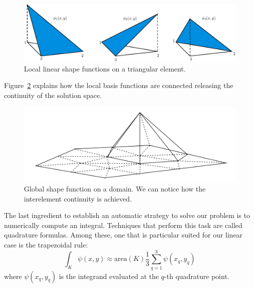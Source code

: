 \documentclass[11pt]{amsart}
\begin{document}
\begin{figure}[h]
\centering
\includegraphics[scale=.8]{local_shape_funcs-pics.pdf}
\caption{Local linear shape functions on a triangular element.}
\label{fig:local}
\end{figure}

Figure~\ref{fig:tent} explains how the local basis functions are connected 
releasing the continuity of the solution space. 

\begin{figure}[h]
\centering
\includegraphics[scale=.4]{tent.png}
\caption{Global shape function on a domain. We can notice how the 
interelement continuity is achieved.}
\label{fig:tent}
\end{figure}

The last ingredient to establish an automatic strategy to solve our problem is 
to numerically compute an integral. 
Techniques that perform this task are called quadrature formulas. Among 
these, one that is particular suited for our linear case is the trapezoidal rule:
\[
\int_K \psi(x,y) \approx \mathrm{area}(K) \frac{1}{3}\sum_{q=1}^3\psi(x_q,y_q)
\]
where $\psi(x_q,y_q)$ is the integrand evaluated at the $q$-th quadrature point.
\end{document}
